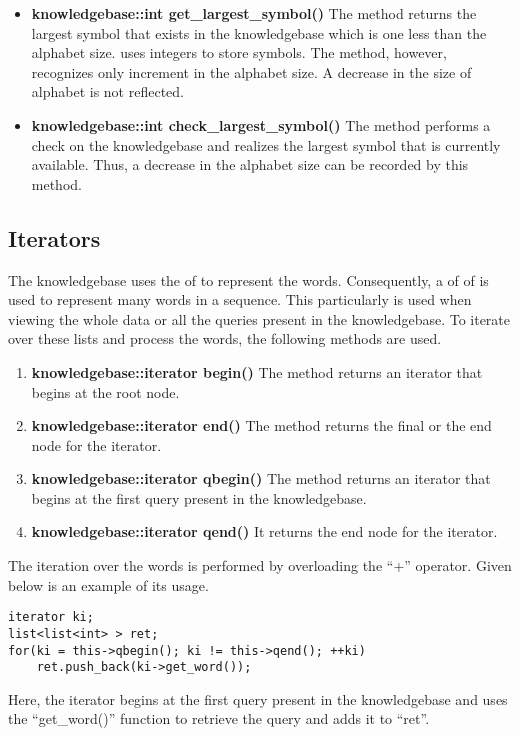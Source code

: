 \begin{itemize}
\item \textbf{knowledgebase::int get\_largest\_symbol()} \vskip 1pt 
The method returns the largest symbol that exists in the knowledgebase which is one less than the alphabet size. \libalf uses integers to store symbols. The method, however, recognizes only increment in the alphabet size. A decrease in the size of alphabet is not reflected. 

\item \textbf{knowledgebase::int check\_largest\_symbol()} \hfill \vskip 1pt
The method performs a check on the knowledgebase and realizes the largest symbol that is currently available. Thus, a decrease in the alphabet size can be recorded by this method.
\end{itemize}	

\subsection*{Iterators}

The knowledgebase uses the \lists of \integer to represent the words. Consequently, a \lists of \lists of \integer is used to represent many words in a sequence. This particularly is used when viewing the whole data or all the queries present in the knowledgebase. To iterate over these lists and process the words, the following methods are used. 

\begin{enumerate}
\item \textbf{knowledgebase::iterator begin()} \vskip 1pt
	The method returns an iterator that begins at the root node.

\item \textbf{knowledgebase::iterator end()} \vskip 1pt
	The method returns the final or the end node for the iterator.
	 
\item \textbf{knowledgebase::iterator qbegin()} \vskip 1pt
	The method returns an iterator that begins at the first query present in the knowledgebase.
	
\item \textbf{knowledgebase::iterator qend()} \vskip 1pt
	It returns the end node for the iterator.
\end{enumerate}

The iteration over the words is performed by overloading the ``+'' operator. Given below is an example of its usage.
\begin{lstlisting}
iterator ki;
list<list<int> > ret;
for(ki = this->qbegin(); ki != this->qend(); ++ki)
	ret.push_back(ki->get_word());
\end{lstlisting}
Here, the iterator begins at the first query present in the knowledgebase and uses the ``get\_word()'' function to retrieve the query and adds it to ``ret''.

